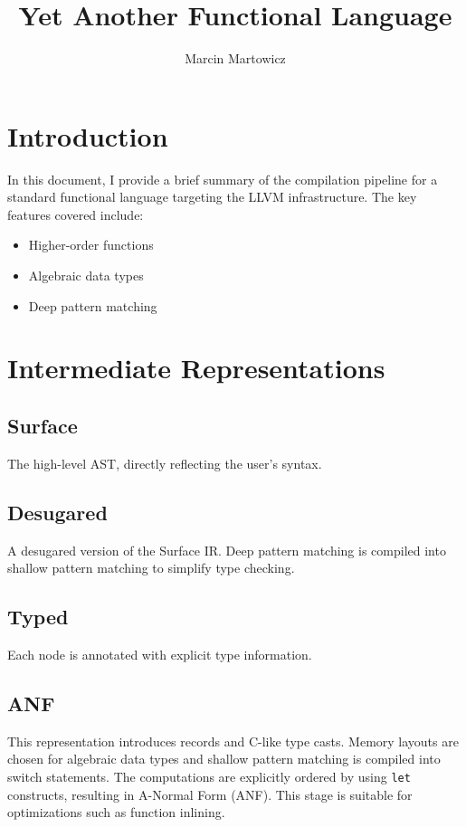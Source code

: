 \documentclass{article}
\title{Yet Another Functional Language}
\author{Marcin Martowicz}
\date{}
\begin{document}
\maketitle

\section{Introduction}
In this document, I provide a brief summary of the compilation pipeline for a standard functional language targeting the LLVM infrastructure.
The key features covered include:
\begin{itemize}
    \item Higher-order functions
    \item Algebraic data types
    \item Deep pattern matching
\end{itemize}

\section{Intermediate Representations}

\subsection{Surface}
The high-level AST, directly reflecting the user's syntax.

\subsection{Desugared}
A desugared version of the Surface IR. Deep pattern matching is compiled into shallow pattern matching to simplify type checking.

\subsection{Typed}
Each node is annotated with explicit type information.

\subsection{ANF}
This representation introduces records and C-like type casts.
Memory layouts are chosen for algebraic data types and shallow pattern matching is compiled into switch statements.
The computations are explicitly ordered by using \texttt{let} constructs, resulting in A-Normal Form (ANF).
This stage is suitable for optimizations such as function inlining.
\end{document}
